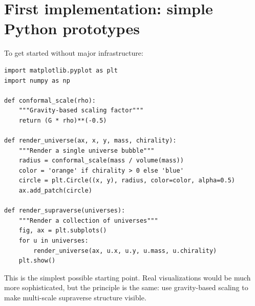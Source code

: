 \section{First implementation: simple Python prototypes}

To get started without major infrastructure:

\begin{verbatim}
import matplotlib.pyplot as plt
import numpy as np

def conformal_scale(rho):
    """Gravity-based scaling factor"""
    return (G * rho)**(-0.5)

def render_universe(ax, x, y, mass, chirality):
    """Render a single universe bubble"""
    radius = conformal_scale(mass / volume(mass))
    color = 'orange' if chirality > 0 else 'blue'
    circle = plt.Circle((x, y), radius, color=color, alpha=0.5)
    ax.add_patch(circle)

def render_supraverse(universes):
    """Render a collection of universes"""
    fig, ax = plt.subplots()
    for u in universes:
        render_universe(ax, u.x, u.y, u.mass, u.chirality)
    plt.show()
\end{verbatim}

This is the simplest possible starting point. Real visualizations would be much
more sophisticated, but the principle is the same: use gravity-based scaling to
make multi-scale supraverse structure visible.
